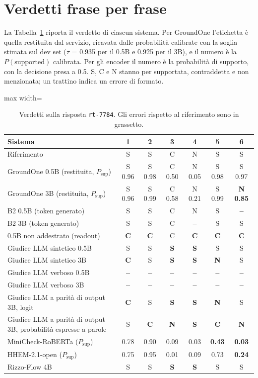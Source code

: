 \section{Verdetti frase per frase}

La Tabella~\ref{tab:app-examples} riporta il verdetto di ciascun sistema. Per GroundOne l'etichetta è quella restituita
dal servizio, ricavata dalle probabilità calibrate con la soglia stimata sul dev set ($\tau$ = 0.935 per il 0.5B e 0.925
per il 3B), e il numero è la $P(\text{supported})$ calibrata. Per gli encoder il numero è la probabilità di supporto, con
la decisione presa a 0.5. S, C e N stanno per supportata, contraddetta e non menzionata; un trattino indica un errore di
formato.

\begin{table}[htbp]
\centering
\caption{Verdetti sulla risposta \texttt{rt-7784}. Gli errori rispetto al riferimento sono in grassetto.}
\label{tab:app-examples}
\small
\begin{adjustbox}{max width=\textwidth}
\begin{tabular}{@{}lcccccc@{}}
\toprule
Sistema & 1 & 2 & 3 & 4 & 5 & 6 \\
\midrule
Riferimento & S & S & C & N & S & S \\
\midrule
GroundOne 0.5B (restituita, $P_\mathrm{sup}$) & S 0.96 & S 0.98 & C 0.50 & N 0.05 & S 0.98 & S 0.97 \\
GroundOne 3B (restituita, $P_\mathrm{sup}$) & S 0.96 & S 0.99 & C 0.58 & N 0.21 & S 0.99 & \textbf{N 0.85} \\
B2 0.5B (token generato) & S & S & C & N & S & \textbf{--} \\
B2 3B (token generato) & S & S & C & \textbf{--} & S & S \\
0.5B non addestrato (readout) & \textbf{C} & \textbf{C} & C & \textbf{C} & \textbf{C} & \textbf{C} \\
Giudice LLM sintetico 0.5B & S & S & \textbf{S} & \textbf{S} & S & S \\
Giudice LLM sintetico 3B & \textbf{C} & S & \textbf{S} & \textbf{S} & \textbf{N} & S \\
Giudice LLM verboso 0.5B & \textbf{--} & \textbf{--} & \textbf{--} & \textbf{--} & \textbf{--} & \textbf{--} \\
Giudice LLM verboso 3B & \textbf{--} & \textbf{--} & \textbf{--} & \textbf{--} & \textbf{--} & \textbf{--} \\
Giudice LLM a parità di output 3B, logit & \textbf{C} & S & \textbf{S} & \textbf{S} & \textbf{N} & S \\
Giudice LLM a parità di output 3B, probabilità espresse a parole & S & \textbf{C} & \textbf{N} & \textbf{S} & \textbf{C} & \textbf{N} \\
MiniCheck-RoBERTa ($P_\mathrm{sup}$) & 0.78 & 0.90 & 0.09 & 0.03 & \textbf{0.43} & \textbf{0.03} \\
HHEM-2.1-open ($P_\mathrm{sup}$) & 0.75 & 0.95 & 0.01 & 0.09 & 0.73 & \textbf{0.24} \\
Rizzo-Flow 4B & S & S & \textbf{S} & \textbf{S} & S & S \\
\bottomrule
\end{tabular}
\end{adjustbox}
\end{table}

